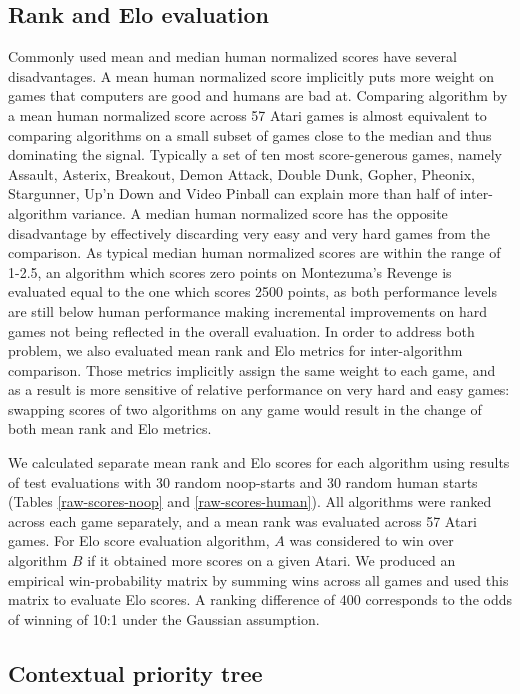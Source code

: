 \documentclass{article}
\begin{document}
\subsection{Rank and Elo evaluation}
\label{rank-and-elo}

Commonly used mean and median human normalized scores have several 
disadvantages. A mean human normalized score implicitly puts more weight on 
games that computers are good and humans are bad at. Comparing algorithm by a 
mean human normalized score across 57 Atari games is almost equivalent to 
comparing algorithms on a small subset of games close to the median 
and thus dominating the signal.
Typically a set of ten most score-generous games, namely Assault, Asterix, 
Breakout, Demon Attack, Double Dunk, Gopher, Pheonix, Stargunner, Up'n Down and 
Video Pinball can explain more than half of inter-algorithm variance. A median 
human normalized score has the opposite disadvantage by effectively discarding 
very easy and very hard games from the comparison. As typical median human 
normalized scores are within the range of 1-2.5, an algorithm which scores zero 
points on Montezuma's Revenge is evaluated equal to the one which scores 2500 
points, as both performance levels are still below human performance making 
incremental improvements on hard games not being reflected in the overall 
evaluation. In order to address both problem, we also evaluated mean rank and 
Elo metrics for inter-algorithm comparison. Those metrics implicitly assign the 
same weight to each game, and as a result is more sensitive of relative 
performance on very 
hard and easy games: swapping scores of two algorithms on any game would 
result in the change of both mean rank and Elo metrics.

We calculated separate mean rank and Elo scores for each algorithm using 
results of test evaluations with 30 random noop-starts and 30 random human 
starts (Tables \ref{raw-scores-noop} and \ref{raw-scores-human}).
All algorithms were ranked across each game separately, and a mean rank 
was evaluated across 57 Atari games. For Elo score 
evaluation algorithm, $A$ was considered to win over algorithm $B$ if 
it obtained more scores on a given Atari. We produced an empirical 
win-probability matrix by summing wins across all games and used this matrix to 
evaluate Elo scores. A ranking difference of 400 corresponds to the odds 
of winning of 10:1 under the Gaussian assumption.

\subsection{Contextual priority tree}
\label{app-tree-prioritized}
\end{document}
